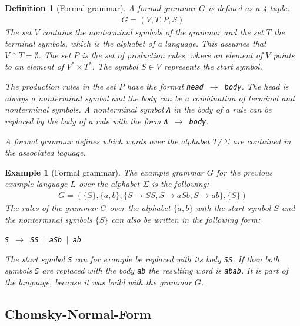 \documentclass[a4paper, 11pt]{article}
\newtheorem*{example*}{Example}
\newtheorem*{definition*}{Definition}
\begin{document}
\begin{definition*}[Formal grammar]
A formal grammar $G$ is defined as a 4-tuple:
\begin{align*}
G = (V, T, P, S)
\end{align*}
The set $V$ contains the nonterminal symbols of the grammar and the set $T$ the terminal symbols, which is the alphabet of a language. This assumes that $V \cap T = \emptyset$. The set $P$ is the set of production rules, where an element of $V$ points to an element of $V^* \times T^*$. The symbol $S \in V$ represents the start symbol. 

The production rules in the set $P$ have the format \texttt{head $\rightarrow$ body}. The head is always a nonterminal symbol and the body can be a combination of terminal and nonterminal symbols. A nonterminal symbol \texttt{A} in the body of a rule can be replaced by the body of a rule with the form \texttt{A $\rightarrow$ body}.
\cite{LS_Ulm}

A formal grammar defines which words over the alphabet $T$/$ \ \Sigma$ are contained in the associated laguage.
\end{definition*}

\begin{example*}[Formal grammar]
The example grammar $G$ for the previous example language $L$ over the alphabet $\Sigma$ is the following:
\begin{align*}
G = (\{S\}, \{ a, b \}, \{ S \rightarrow SS, S \rightarrow  aSb, S \rightarrow ab \},  \{ S \})
\end{align*}
The rules of the grammar $G$ over the alphabet $\{a, b\}$ with the start symbol $S$ and the nonterminal symbols $\{ S \}$ can also be written in the following form:
\begin{center}
\texttt{S $\rightarrow$ SS $\mid$  aSb $\mid$ ab}
\end{center}
The start symbol \texttt{S} can for example be replaced with its body \texttt{SS}. If then both symbols \texttt{S} are replaced with the body \texttt{ab} the resulting word is \texttt{abab}. It is part of the language, because it was build with the grammar $G$.
\end{example*}


\subsection{Chomsky-Normal-Form}
\label{cnf}
\end{document}
